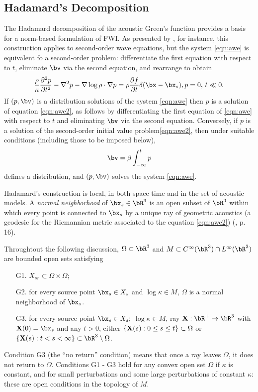 \subsection{Hadamard's Decomposition}
The Hadamard decomposition of the acoustic Green's function \cite[]{Friedlander:75,Qian:JCP24} provides a
basis for a norm-based formulation of FWI. As presented by
\cite{Friedlander:75}, for instance, this construction applies to
second-order wave equations, but the system \ref{eqn:awe} is
equivalent fo a second-order problem: differentiate the first equation
with respect to $t$, eliminate $\bv$ via the second equation, and
rearrange to obtain
\begin{equation}
  \label{eqn:awe2}
  \frac{\rho}{\kappa}\frac{\partial^2 p}{\partial t^2} - \nabla^2 p -
  \nabla \log \rho \cdot \nabla p = \rho \frac{\partial f}{\partial t}
  \delta(\bx-\bx_s), \nonumber \\
  p=0, \, t \ll 0.
\end{equation}
If $(p,\bv)$ is a distribution solutions of the system
\ref{eqn:awe} then $p$ is a solution of equation
\ref{eqn:awe2}, as follows by differentiating the first equation of
\ref{eqn:awe} with respect to $t$ and eliminating $\bv$ via the second
equation. Conversely, if $p$ is a solution of the second-order initial
value problem\ref{eqn:awe2}, then under suitable conditions (including
those to be imposed below),
\[
  \bv = \beta \int_{-\infty}^t p
\]
defines a distribution, and $(p,\bv)$ solves the system \ref{eqn:awe}.

Hadamard's construction is local, in both space-time and in the set of
acoustic models. A {\em normal neighborhood} of
$\bx_s \in \bR^3$ is an open subset of $\bR^3$ 
within which every point is connected to $\bx_s$ by  a unique ray of
geometric acoustics (a geodesic for the Riemannian metric associated
to the equation \ref{eqn:awe2}) (\cite{Friedlander:75},
p. 16).

Throughtout the following discussion, $\Omega\subset \bR^3$ 
and $M \subset C^{\infty}(\bR^3) \cap L^{\infty}(\bR^3)$ are bounded open sets satisfying 
\begin{itemize}
  \item[G1. ] $X_{sr} \subset \Omega \times \Omega$;
  \item[G2. ] for every source point $\bx_s\in X_{s}$ and $\log \kappa \in M$, $\Omega$ is a
    normal neighborhood of $\bx_s$.
  \item[G3. ] for every source point $\bx_s \in X_{s};$
    $\log \kappa \in M$, ray ${\bf X}:\bR^+\rightarrow \bR^3$
    with ${\bf X}(0)=\bx_s$ and any $t>0$, either $\{{\bf X}(s): 0\le s \le t\} \subset \Omega$
    or $\{{\bf X}(s): t < s < \infty\} \subset \bR^3 \setminus \Omega$.
  \end{itemize}
Condition G3 (the ``no return'' condition) means that once a ray
leaves $\Omega$, it does not return to $\Omega$. Conditions G1 - G3
hold for any convex open set $\Omega$ if $\kappa$ is constant, and for small perturbations and some
large perturbations of constant $\kappa$: these are open conditions in
the topology of $M$.

